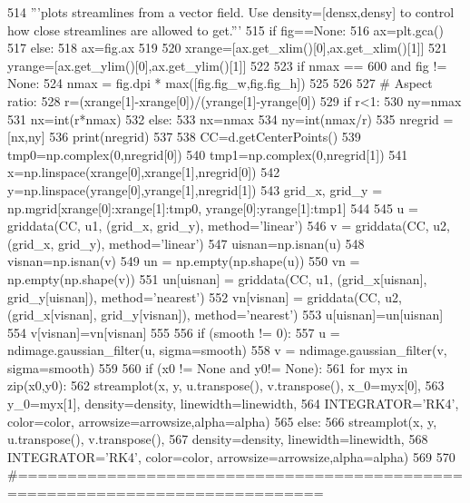 \begin{DoxyCode}
514     \textcolor{stringliteral}{'''plots streamlines from a vector field.  Use density=[densx,densy] to control how close streamlines
       are allowed to get.'''}
515     \textcolor{keywordflow}{if} fig==\textcolor{keywordtype}{None}:
516         ax=plt.gca()
517     \textcolor{keywordflow}{else}:
518         ax=fig.ax
519 
520     xrange=[ax.get\_xlim()[0],ax.get\_xlim()[1]]
521     yrange=[ax.get\_ylim()[0],ax.get\_ylim()[1]]
522 
523     \textcolor{keywordflow}{if} nmax == 600 \textcolor{keywordflow}{and} fig != \textcolor{keywordtype}{None}:
524         nmax = fig.dpi * max([fig.fig\_w,fig.fig\_h])
525 
526 
527     \textcolor{comment}{# Aspect ratio:}
528     r=(xrange[1]-xrange[0])/(yrange[1]-yrange[0])
529     \textcolor{keywordflow}{if} r<1:
530         ny=nmax
531         nx=int(r*nmax)
532     \textcolor{keywordflow}{else}:
533         nx=nmax
534         ny=int(nmax/r)
535     nregrid = [nx,ny]
536     print(nregrid)
537     
538     CC=d.getCenterPoints()
539     tmp0=np.complex(0,nregrid[0])
540     tmp1=np.complex(0,nregrid[1])
541     x=np.linspace(xrange[0],xrange[1],nregrid[0])
542     y=np.linspace(yrange[0],yrange[1],nregrid[1])
543     grid\_x, grid\_y = np.mgrid[xrange[0]:xrange[1]:tmp0, yrange[0]:yrange[1]:tmp1]
544 
545     u = griddata(CC, u1, (grid\_x, grid\_y), method=\textcolor{stringliteral}{'linear'})
546     v = griddata(CC, u2, (grid\_x, grid\_y), method=\textcolor{stringliteral}{'linear'})
547     uisnan=np.isnan(u)
548     visnan=np.isnan(v)
549     un = np.empty(np.shape(u))
550     vn = np.empty(np.shape(v))
551     un[uisnan] = griddata(CC, u1, (grid\_x[uisnan], grid\_y[uisnan]), method=\textcolor{stringliteral}{'nearest'})
552     vn[visnan] = griddata(CC, u2, (grid\_x[visnan], grid\_y[visnan]), method=\textcolor{stringliteral}{'nearest'})
553     u[uisnan]=un[uisnan]
554     v[visnan]=vn[visnan]
555 
556     \textcolor{keywordflow}{if} (smooth != 0):
557         u = ndimage.gaussian\_filter(u, sigma=smooth)
558         v = ndimage.gaussian\_filter(v, sigma=smooth)
559 
560     \textcolor{keywordflow}{if} (x0 != \textcolor{keywordtype}{None} \textcolor{keywordflow}{and} y0!= \textcolor{keywordtype}{None}):
561         \textcolor{keywordflow}{for} myx \textcolor{keywordflow}{in} zip(x0,y0):
562             streamplot(x, y, u.transpose(), v.transpose(), x\_0=myx[0], 
563                        y\_0=myx[1], density=density, linewidth=linewidth,
564                        INTEGRATOR=\textcolor{stringliteral}{'RK4'}, color=color, arrowsize=arrowsize,alpha=alpha)
565     \textcolor{keywordflow}{else}:
566         streamplot(x, y, u.transpose(), v.transpose(),  
567                    density=density, linewidth=linewidth,
568                    INTEGRATOR=\textcolor{stringliteral}{'RK4'}, color=color, arrowsize=arrowsize,alpha=alpha)
569 
570 \textcolor{comment}{#=============================================================================}
\end{DoxyCode}
\mbox{\label{namespaceamrplot_ae376991fb7aa92c1e8a41501d7910479}} 
